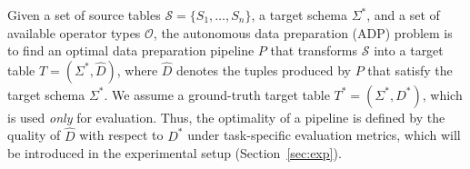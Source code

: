 Given a set of source tables $\mathcal{S} = \{S_1, \ldots, S_n\}$, a target schema $\Sigma^{\ast}$, and a set of available operator types $\mathcal{O}$, the autonomous data preparation (ADP) problem is to find an optimal data preparation pipeline $P$ that transforms $\mathcal{S}$ into a target table $T = (\Sigma^{\ast}, \hat{D})$, where $\hat{D}$ denotes the tuples produced by $P$ that satisfy the target schema $\Sigma^{\ast}$.
We assume a ground-truth target table $T^\ast=(\Sigma^\ast, D^\ast)$, which is used \emph{only} for evaluation. Thus, the optimality of a pipeline is defined by the quality of $\hat{D}$ with respect to $D^\ast$ under task-specific evaluation metrics, which will be introduced in the experimental setup (Section~\ref{sec:exp}).
%
\begin{example}


\end{example}
